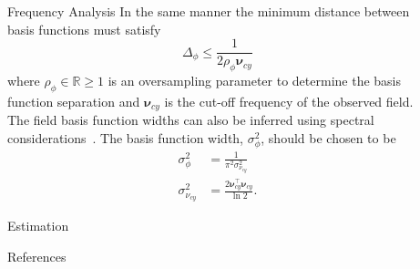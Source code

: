 \documentclass[final]{beamer}
\newlength{\sepwid}
\newlength{\onecolwid}
\begin{document}
\begin{frame}[t]
\begin{columns}[t]
\begin{column}{\onecolwid}
\begin{block}{Frequency Analysis}
{		In the same manner the minimum distance between basis functions must satisfy 
		\begin{equation}\label{eq:BasisFunctionSeparation}
			\Delta_{\phi} \leq \frac{1}{2\rho_{\phi}\boldsymbol{\nu}_{cy}}
		\end{equation}
		where $\rho_{\phi} \in \mathbb{R} \ge 1$ is an oversampling parameter to determine the basis function separation and $\boldsymbol{\nu}_{cy}$ is the cut-off frequency of the observed field.
		The field basis function widths can also be inferred using spectral considerations~\cite{Scerri2009}. The basis function width, $\sigma^2_{\phi}$, should be chosen to be
		\begin{align}\label{eq:WidthCutOffRelationship}
		 \sigma^2_{\phi} &= \frac{1}{\pi^2\sigma_{\nu_{cy}}^2} \\
		 \sigma^2_{\nu_{cy}} &= \frac{2\boldsymbol\nu_{cy}^\top \boldsymbol\nu_{cy}}{\ln2}.
		\end{align}}
	\end{block}
	\begin{block}{Estimation}
	\end{block}	
	\begin{block}{References}
        \small{}	\end{block}
\end{column}

  \begin{column}{\sepwid}\end{column}			%
	\begin{column}{\onecolwid}	


\end{column}
\end{columns}
\end{frame}
\end{document}
